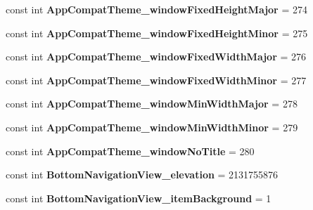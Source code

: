 \begin{DoxyCompactItemize}
const int {\bfseries App\+Compat\+Theme\+\_\+window\+Fixed\+Height\+Major} = 274
\item 
\mbox{\label{classst_delivery_1_1_resource_1_1_styleable_a4ad2763505c1090600b5ac1d1c7e160a}} 
const int {\bfseries App\+Compat\+Theme\+\_\+window\+Fixed\+Height\+Minor} = 275
\item 
\mbox{\label{classst_delivery_1_1_resource_1_1_styleable_a22624512002ca381465e4858b3a27bc4}} 
const int {\bfseries App\+Compat\+Theme\+\_\+window\+Fixed\+Width\+Major} = 276
\item 
\mbox{\label{classst_delivery_1_1_resource_1_1_styleable_ab99643d552ef25af83cc619bec883c85}} 
const int {\bfseries App\+Compat\+Theme\+\_\+window\+Fixed\+Width\+Minor} = 277
\item 
\mbox{\label{classst_delivery_1_1_resource_1_1_styleable_a0c4f2611ec433282503e59fe172ce4a1}} 
const int {\bfseries App\+Compat\+Theme\+\_\+window\+Min\+Width\+Major} = 278
\item 
\mbox{\label{classst_delivery_1_1_resource_1_1_styleable_adbdb0434a2c4adacd8fd718f9fc351bb}} 
const int {\bfseries App\+Compat\+Theme\+\_\+window\+Min\+Width\+Minor} = 279
\item 
\mbox{\label{classst_delivery_1_1_resource_1_1_styleable_a622232091fbffa74de55c60ad62416fe}} 
const int {\bfseries App\+Compat\+Theme\+\_\+window\+No\+Title} = 280
\item 
\mbox{\label{classst_delivery_1_1_resource_1_1_styleable_ae68509568c5fc77ce4e10b316a4919c0}} 
const int {\bfseries Bottom\+Navigation\+View\+\_\+elevation} = 2131755876
\item 
\mbox{\label{classst_delivery_1_1_resource_1_1_styleable_ad0c256bb2c5a11f33ddf7df0db381686}} 
const int {\bfseries Bottom\+Navigation\+View\+\_\+item\+Background} = 1
\item 
\mbox{\label{classst_delivery_1_1_resource_1_1_styleable_a3f6d32d24c46a8ee68216bcf53da50c4}} 

\end{DoxyCompactItemize}
